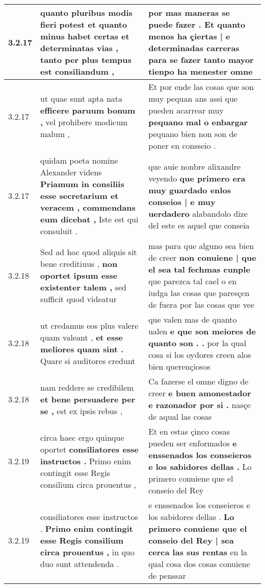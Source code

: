 \begin{tabular}{|p{1cm}|p{6.5cm}|p{6.5cm}|}
3.2.17 & quanto pluribus modis fieri potest \textbf{ et quanto minus habet certas et determinatas vias , } tanto per plus tempus est consiliandum , & por mas maneras se puede fazer . \textbf{ Et quanto menos ha çiertas | e determinadas carreras } para se fazer tanto mayor tienpo ha menester omne \\\hline
3.2.17 & ut quae sunt apta nata \textbf{ efficere paruum bonum , } vel prohibere modicum malum , & Et por ende las cosas que son muy pequan ans assi que pueden acarrear muy \textbf{ pequano mal o enbargar } pequano bien non son de poner en consseio . \\\hline
3.2.17 & quidam poeta nomine Alexander videns \textbf{ Priamum in consiliis esse secretarium et veracem , commendans eum dicebat , } Iste est qui consuluit . & que auie nonbre alixandre veyendo \textbf{ que primero era muy guardado enlos conseios | e muy uerdadero } alabandolo dize del este es aquel que conseia \\\hline
3.2.18 & Sed ad hoc quod aliquis sit bene creditiuus , \textbf{ non oportet ipsum esse existenter talem , } sed sufficit quod videatur & mas para que alguno sea bien de creer \textbf{ non conuiene | que el sea tal fechmas cunple } que parezca tal cael o en iudga las cosas que paresçen de fuera por las cosas que vee \\\hline
3.2.18 & ut credamus eos plus valere quam valeant , \textbf{ et esse meliores quam sint . } Quare si auditores credunt & que valen mas de quanto ualen \textbf{ e que son meiores de quanto son . . } por la qual cosa si los oydores creen alos bien querençiosos \\\hline
3.2.18 & nam reddere se credibilem \textbf{ et bene persuadere per se , } est ex ipsis rebus , & Ca fazerse el omne digno de creer \textbf{ e buen amonestador e razonador por si . } nasçe de aqual las cosas \\\hline
3.2.19 & circa haec ergo quinque oportet \textbf{ consiliatores esse instructos . } Primo enim contingit esse Regis consilium circa prouentus , & Et en estas çinco cosas pueden ser enformados \textbf{ e enssenados los conseieros e los sabidores dellas . } Lo primero conuiene que el conseio del Rey \\\hline
3.2.19 & consiliatores esse instructos . \textbf{ Primo enim contingit esse Regis consilium circa prouentus , } in quo duo sunt attendenda . & e enssenados los conseieros e los sabidores dellas . \textbf{ Lo primero conuiene que el conseio del Rey | sea cerca las sus rentas } en la qual cosa dos cosas conuiene de penssar \\\hline

\end{tabular}
